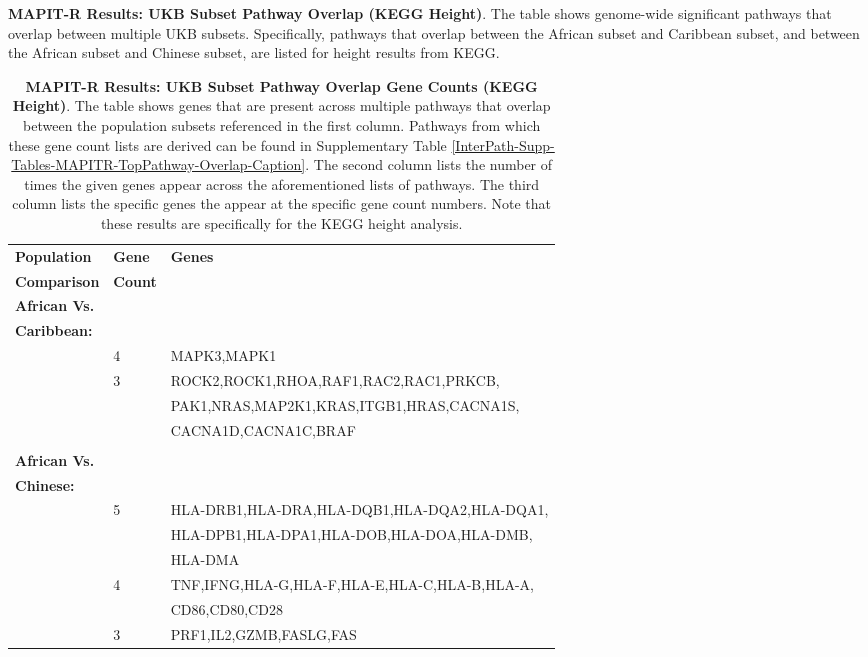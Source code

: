 \documentclass[12pt, a4paper]{article}
\begin{document}
\addtocounter{table}{-1}
\begin{table} [t!]
  \caption{\textbf{MAPIT-R Results: UKB Subset Pathway Overlap (KEGG Height)}. The table shows genome-wide significant pathways that overlap between multiple UKB subsets. Specifically, pathways that overlap between the African subset and Caribbean subset, and between the African subset and Chinese subset, are listed for height results from KEGG.}
\label{InterPath-Supp-Tables-MAPITR-TopPathway-Overlap-Caption}
\end{table}
\clearpage

\setlength{\footskip}{2cm}
\begin{table}[ht]
\centering
\begin{tabular}{lll}
  \hline
 \textbf{Population} & \textbf{Gene} & \textbf{Genes} \\
 \textbf{Comparison} & \textbf{Count} & \\
  \hline
\textbf{African Vs.} & & \\
\textbf{Caribbean:} & & \\
& 4 & MAPK3,MAPK1 \\
& 3 & ROCK2,ROCK1,RHOA,RAF1,RAC2,RAC1,PRKCB, \\
& & PAK1,NRAS,MAP2K1,KRAS,ITGB1,HRAS,CACNA1S, \\
& & CACNA1D,CACNA1C,BRAF \\
\\
\textbf{African Vs.} & & \\
\textbf{Chinese:} & & \\
& 5 & HLA-DRB1,HLA-DRA,HLA-DQB1,HLA-DQA2,HLA-DQA1, \\
& & HLA-DPB1,HLA-DPA1,HLA-DOB,HLA-DOA,HLA-DMB, \\
& & HLA-DMA \\
& 4 & TNF,IFNG,HLA-G,HLA-F,HLA-E,HLA-C,HLA-B,HLA-A, \\ 
& & CD86,CD80,CD28 \\
& 3 & PRF1,IL2,GZMB,FASLG,FAS \\
   \hline
\end{tabular}
\caption[TBD]{\textbf{MAPIT-R Results: UKB Subset Pathway Overlap Gene Counts (KEGG Height)}. The table shows genes that are present across multiple pathways that overlap between the population subsets referenced in the first column. Pathways from which these gene count lists are derived can be found in Supplementary Table \ref{InterPath-Supp-Tables-MAPITR-TopPathway-Overlap-Caption}. The second column lists the number of times the given genes appear across the aforementioned lists of pathways. The third column lists the specific genes the appear at the specific gene count numbers. Note that these results are specifically for the KEGG height analysis.}
\label{InterPath-Supp-Tables-MAPITR-TopPathway-GeneCounts-Overlap}
\end{table}
\clearpage
\setlength{\footskip}{1cm}
\end{document}

